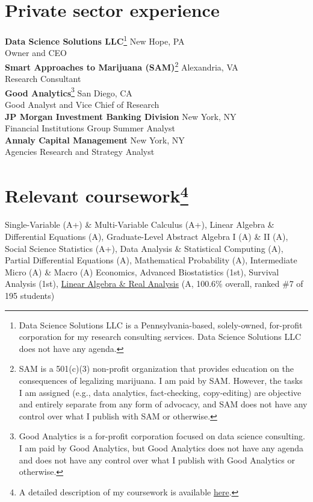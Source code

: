 \documentclass[10pt, letterpaper]{article}
\newcommand{\years}[1]{\marginnote{\normalsize #1}}
\begin{document}

\section*{Private sector experience}

\years{2019-}\textbf{Data Science Solutions LLC}\footnote{Data Science Solutions LLC is a Pennsylvania-based, solely-owned, for-profit corporation for my research consulting services. Data Science Solutions LLC does not have any agenda.} \hfill New Hope, PA\\
Owner and CEO\\[.2cm]
\years{2019-}\textbf{Smart Approaches to Marijuana (SAM)}\footnote{SAM is a 501(c)(3) non-profit organization that provides education on the consequences of legalizing marijuana. I am paid by SAM. However, the tasks I am assigned (e.g., data analytics, fact-checking, copy-editing) are objective and entirely separate from any form of advocacy, and SAM does not have any control over what I publish with SAM or otherwise.} \hfill Alexandria, VA\\
Research Consultant\\[.2cm]
\years{2019-}\textbf{Good Analytics}\footnote{Good Analytics is a for-profit corporation focused on data science consulting. I am paid by Good Analytics, but Good Analytics does not have any agenda and does not have any control over what I publish with Good Analytics or otherwise.} \hfill San Diego, CA\\
Good Analyst and Vice Chief of Research\\[.2cm]
\years{2016}\textbf{JP Morgan Investment Banking Division} \hfill New York, NY\\
Financial Institutions Group Summer Analyst\\[.2cm]
\years{2015}\textbf{Annaly Capital Management} \hfill New York, NY\\
Agencies Research and Strategy Analyst\\[.2cm]
%
%

\section*{Relevant coursework\footnote{A detailed description of my coursework is available \href{https://www.theodorecaputi.com/files/TheodoreCaputiRelevantCoursework.pdf}{here}.}}
Single-Variable (A+) \& Multi-Variable Calculus (A+), Linear Algebra \& Differential Equations (A), Graduate-Level Abstract Algebra I (A) \& II (A), Social Science Statistics (A+), Data Analysis \& Statistical Computing (A), Partial Differential Equations (A), Mathematical Probability (A), Intermediate Micro (A) \& Macro (A) Economics, Advanced Biostatistics (1st), Survival Analysis (1st), \href{https://www.theodorecaputi.com/files/Math23ALetter.pdf}{Linear Algebra \& Real Analysis} (A, 100.6\% overall, ranked \#7 of 195 students)\\[.1cm]
\end{document}
